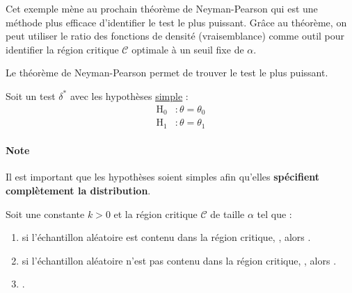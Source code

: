 \documentclass[french]{article}
\begin{document}
\begin{multicols*}{2}
Cet exemple mène au prochain théorème de Neyman-Pearson qui est une méthode plus efficace d'identifier le test le plus puissant. Grâce au théorème, on peut utiliser le ratio des fonctions de densité (vraisemblance) comme outil pour identifier la région critique $\mathcal{C}$ optimale à un seuil fixe de $\alpha$.


\begin{definitionNOHFILL}
Le théorème de Neyman-Pearson permet de trouver le test le plus puissant.

Soit un test $\delta^{*}$ avec les hypothèses \hyperlink{hyp-simple}{\color{blue!80!white}\underline{simple}} :
\begin{align*}
	\mathrm{H}_{0}	&:	\theta	=	\theta_{0}	\\
	\mathrm{H}_{1}	&:	\theta	=	\theta_{1}
\end{align*}

\paragraph{Note}	Il est important que les hypothèses soient simples afin qu'elles \textbf{spécifient complètement la distribution}.

\bigskip

Soit une constante $k > 0$ et la région critique $\mathcal{C}$ de taille $\alpha$ tel que :
\begin{enumerate}
	\item	si l'échantillon aléatoire est contenu dans la région critique, , alors .
	\item	si l'échantillon aléatoire n'est pas contenu dans la région critique, , alors .
	\item	{}.
\end{enumerate}


\end{definitionNOHFILL}
\end{multicols*}
\end{document}
